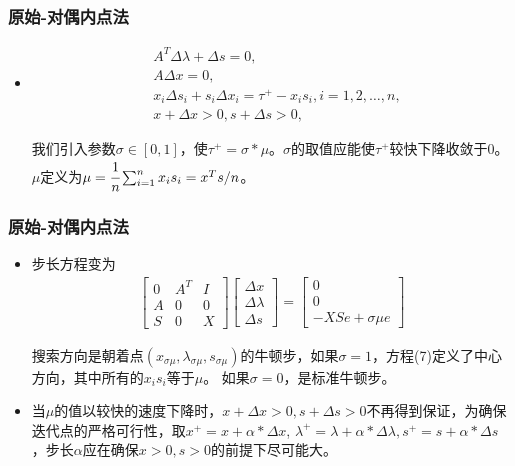 \documentclass[notheorems,mathserif,table,compress]{beamer}  %
\begin{document}
% 
\begin{frame}
\frametitle{原始-对偶内点法} 
\begin{itemize}
\item 
\begin{equation}
\begin{split}
&A^{T}\Delta\lambda+\Delta s=0,\\
&A\Delta x=0,\\
&x_i\Delta s_i+s_i\Delta x_i=\tau^+-x_is_i, i=1,2,\dots,n,\\
&x+\Delta x>0, s+\Delta s>0,
\end{split}
\end{equation}

我们引入参数$\sigma\in[0,1]$，使$\tau^+=\sigma*\mu$。$\sigma$的取值应能使$\tau^+$较快下降收敛于0。$\mu$定义为$\mu=\cfrac{1}{n}\sum_{i=1}^{n}x_is_i=x^Ts/n$。
\end{itemize}
\end{frame}

%
\begin{frame}
\frametitle{原始-对偶内点法}
\begin{itemize}
\item 步长方程变为
\begin{eqnarray}
\begin{bmatrix}
0 & A^T & I\\
A & 0 & 0\\
S & 0 & X
\end{bmatrix}
\begin{bmatrix}
\Delta x\\
\Delta \lambda\\
\Delta s
\end{bmatrix}=
\begin{bmatrix}
0\\
0\\
-XSe+\sigma\mu e
\end{bmatrix}
\end{eqnarray}

搜索方向是朝着点$(x_{\sigma \mu},\lambda_{\sigma \mu},s_{\sigma \mu})$的牛顿步，如果$\sigma=1$，方程(7)定义了中心方向，其中所有的$x_is_i$等于$\mu$。%
如果$\sigma=0$，是标准牛顿步。
\item 当$\mu$的值以较快的速度下降时，$x+\Delta x>0,s+\Delta s>0$不再得到保证，为确保迭代点的严格可行性，取$x^+=x+\alpha*\Delta x$, $\lambda^+=\lambda+\alpha*\Delta \lambda,s^+=s+\alpha*\Delta s$，步长$\alpha$应在确保$x>0,s>0$的前提下尽可能大。
\end{itemize}
\end{frame}
\end{document}
